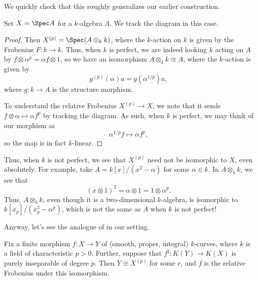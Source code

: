 \documentclass[../notes.tex]{subfiles}
\begin{document}
We quickly check that this roughly generalizes our earlier construction.
\begin{example}
	Set $X=\Spec A$ for a $k$-algebra $A$. We track the diagram in this case.
\end{example}
\begin{proof}
	Then $X^{(p)}=\Spec(A\otimes_kk)$, where the $k$-action on $k$ is given by the Frobenius $F\colon k\to k$. Thus, when $k$ is perfect, we are indeed looking $k$ acting on $A$ by $f\otimes\alpha^p=\alpha f\otimes1$, so we have an isomorphism $A\otimes_kk\cong A$, where the $k$-action is given by
	\[g^{(p)}(\alpha)a=g(\alpha^{1/p})a,\]
	where $g\colon k\to A$ is the structure morphism.

	To understand the relative Frobenius $X^{(p)}\to X$, we note that it sends $f\otimes\alpha\mapsto\alpha f^p$ by tracking the diagram. As such, when $k$ is perfect, we may think of our morphism as
	\[\alpha^{1/p}f\mapsto\alpha f^p,\]
	so the map is in fact $k$-linear.
\end{proof}
\begin{remark}
	Thus, when $k$ is not perfect, we see that $X^{(p)}$ need not be isomorphic to $X$, even absolutely. For example, take $A=k[x]/\left(x^2-\alpha\right)$ for some $\alpha\in k$. In $A\otimes_kk$, we see that
	\[(x\otimes1)^2=\alpha\otimes1=1\otimes\alpha^p.\]
	Thus, $A\otimes_kk$, even though it is a two-dimensional $k$-algebra, is isomorphic to $k[x_p]/\left(x_p^2-\alpha^p\right)$, which is not the same as $A$ when $k$ is not perfect!
\end{remark}
Anyway, let's see the analogue of  in our setting.
\begin{theorem}
	Fix a finite morphism $f\colon X\to Y$ of (smooth, proper, integral) $k$-curves, where $k$ is a field of characteristic $p>0$. Further, suppose that $f^\sharp\colon K(Y)\to K(X)$ is purely inseparable of degree $p$. Then $Y\cong X^{(p)}$ for some $r$, and $f$ is the relative Frobenius under this isomorphism.
\end{theorem}
\end{document}
